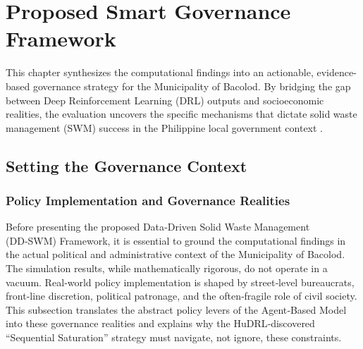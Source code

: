 \chapter{Proposed Smart Governance Framework}

This chapter synthesizes the computational findings into an actionable, evidence-based governance strategy for the Municipality of Bacolod. By bridging the gap between Deep Reinforcement Learning (DRL) outputs and socioeconomic realities, the evaluation uncovers the specific mechanisms that dictate solid waste management (SWM) success in the Philippine local government context \citep{Jimenez2025}.

\section{Setting the Governance Context}

\subsection{Policy Implementation and Governance Realities}
\label{sec:governance_reality}

Before presenting the proposed Data‑Driven Solid Waste Management (DD‑SWM) Framework, it is essential to ground the computational findings in the actual political and administrative context of the Municipality of Bacolod. The simulation results, while mathematically rigorous, do not operate in a vacuum. Real‑world policy implementation is shaped by street‑level bureaucrats, front‑line discretion, political patronage, and the often‑fragile role of civil society. This subsection translates the abstract policy levers of the Agent‑Based Model into these governance realities and explains why the HuDRL‑discovered “Sequential Saturation” strategy must navigate, not ignore, these constraints.

